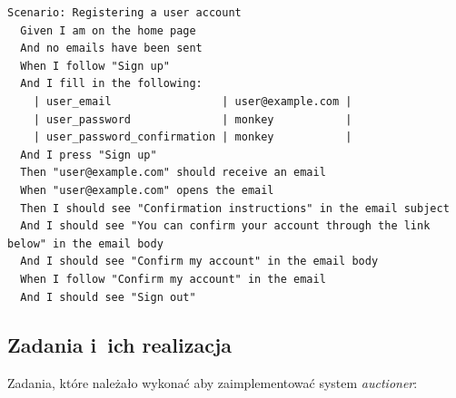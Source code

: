  \label{code.simpleruby}
\begin{lstlisting}
Scenario: Registering a user account
  Given I am on the home page
  And no emails have been sent
  When I follow "Sign up"
  And I fill in the following:
    | user_email                 | user@example.com |
    | user_password              | monkey           |
    | user_password_confirmation | monkey           |
  And I press "Sign up"
  Then "user@example.com" should receive an email
  When "user@example.com" opens the email
  Then I should see "Confirmation instructions" in the email subject
  And I should see "You can confirm your account through the link below" in the email body
  And I should see "Confirm my account" in the email body
  When I follow "Confirm my account" in the email
  And I should see "Sign out"
\end{lstlisting}

\newpage

\subsection{Zadania i~ich realizacja}

Zadania, które należało wykonać aby zaimplementować system \textit{auctioner}:


